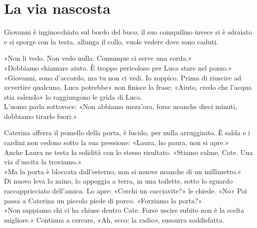 \chapter{La via nascosta}

Giovanni \`e inginocchiato sul bordo del buco; il suo coinquilino invece si \`e sdraiato e si  sporge  con la testa, allunga il collo, vuole vedere  dove sono caduti.

«Non li vedo. Non vedo nulla. Comunque ci serve una corda.»\\
«Dobbiamo chiamare aiuto. \`E troppo pericoloso per Luca stare nel pozzo.»\\
«Giovanni, sono d’accordo, ma tu non ci vedi. Io zoppico. Prima di riuscire ad avvertire qualcuno, Luca potrebbe» non finisce la frase:
«Aiuto, credo che l’acqua stia salendo» lo raggiungono le grida di Luca.\\
L'uomo parla sottovoce: «Non abbiamo mezz’ora, forse neanche dieci minuti, dobbiamo tirarlo fuori.»

\par\medskip
Caterina afferra il pomello della porta, \`e lucido, per nulla arrugginito. \`E salda e i cardini non cedono  sotto la sua pressione:
«Laura, ho paura, non si apre.»\\
Anche Laura ne testa la solidità con lo stesso risultato. «Stiamo calme, Cate. Una via d’uscita la troviamo.»\\
«Ma la porta \`e bloccata dall’esterno, non si muove neanche di un millimetro.»\\
Di nuovo leva lo zaino, lo appoggia a terra, in una toilette, sotto lo sguardo raccappricciato dell'amica. Lo apre:
«Cerchi un cacciavite?» le chiede. «No» Poi passa a Caterina un piccolo piede di porco. «Forziamo la porta?»\\
«Non sappiamo chi ci ha chiuse dentro Cate. Forse uscire subito non \`e la scelta migliore.» Continua a cercare, «Ah, ecco: la radio», sussurra soddisfatta.

\separatore

